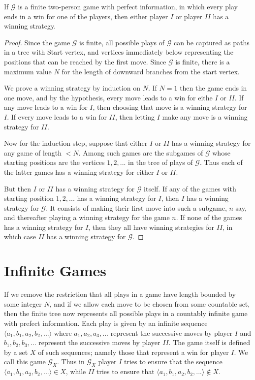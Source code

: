 \documentclass[12pt, a4paper, oneside, openright, titlepage]{book}
\begin{document}
\begin{thm}
    If $\mathcal{G}$ is a finite two-person game with perfect information, in which every play ends in a win for one of the players, then either player $I$ or player $II$ has a winning strategy.
\end{thm}
\begin{proof}
    Since the game $\mathcal{G}$ is finite, all possible plays of $\mathcal{G}$ can be captured as paths in a tree with Start vertex, and vertices immediately below representing the positions that can be reached by the first move. Since $\mathcal{G}$ is finite, there is a maximum value $N$ for the length of downward branches from the start vertex.

    We prove a winning strategy by induction on $N$. If $N = 1$ then the game ends in one move, and by the hypothesis, every move leads to a win for eithe $I$ or $II$. If any move leads to a win for $I$, then choosing that move is a winning strategy for $I$. If every move leads to a win for $II$, then letting $I$ make any move is a winning strategy for $II$.

    Now for the induction step, suppose that either $I$ or $II$ has a winning strategy for any game of length $< N$. Among such games are the subgames of $\mathcal{G}$ whose starting positions are the vertices $1,2,...$ in the tree of plays of $\mathcal{G}$. Thus each of the latter games has a winning strategy for either $I$ or $II$.

    But then $I$ or $II$ has a winning strategy for $\mathcal{G}$ itself. If any of the games with starting position $1,2,...$ has a winning strategy for $I$, then $I$ has a winning strategy for $\mathcal{G}$. It consists of making their first move into such a subgame, $n$ say, and thereafter playing a winning strategy for the game $n$. If none of the games has a winning strategy for $I$, then they all have winning strategies for $II$, in which case $II$ has a winning strategy for $\mathcal{G}$. 
\end{proof}



\section{Infinite Games}

If we remove the restriction that all plays in a game have length bounded by some integer $N$, and if we allow each move to be chosen from some countable set, then the finite tree now represents all possible plays in a countably infinite game with prefect information. Each play is given by an infinite sequence $\langle a_1,b_1,a_2,b_2,...\rangle$ where $a_1,a_2,a_3,...$ represent the successive moves by player $I$ and $b_1,b_2,b_3,...$ represent the successive moves by player $II$. The game itself is defined by a set $X$ of such sequences; namely those that represent a win for player $I$. We call this game $\mathcal{G}_X$. Thus in $\mathcal{G}_X$ player $I$ tries to ensure that the sequence $\langle a_1,b_1,a_2,b_2,...\rangle \in X$, while $II$ tries to ensure that $\langle a_1,b_1,a_2,b_2,...\rangle \notin X$.
\end{document}
